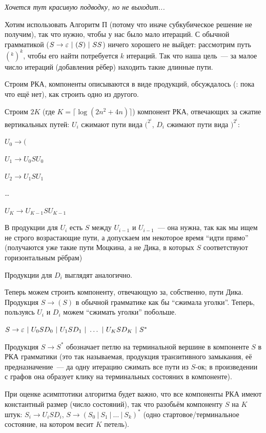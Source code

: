 \textit{Хочется тут красивую подводку, но не выходит...}

Хотим использовать Алгоритм П (потому что иначе субкубическое решение не получим), так что нужно, чтобы у нас было мало итераций. С обычной грамматикой ($S \rightarrow \varepsilon~|~(S)~|~SS$) ничего хорошего не выйдет: рассмотрим путь $(^k )^k$, чтобы его найти потребуется $k$ итераций. Так что наша цель~--- за малое число итераций (добавления рёбер) находить такие длинные пути.

Строим РКА, компоненты описываются в виде продукций, обсуждалось (\TODO: пока что ещё нет), как строить одно из другого.

Строим $2K$ (где $K = \lceil \log (2 n^2 + 4n) \rceil$) компонент РКА, отвечающих за сжатие вертикальных путей: $U_i$ сжимают пути вида $(^{2^i}$, $D_i$ сжимают пути вида $)^{2^i}$:

$U_0 \to ($

$U_1 \to U_0 S U_0$

$U_2 \to U_1 S U_1$

\dots

$U_K \to U_{K-1} S U_{K-1}$ 

В продукции для $U_i$ есть $S$ между $U_{i-1}$ и $U_{i-1}$~--- она нужна, так как мы ищем не строго возрастающие пути, а допускаем им некоторое время ``идти прямо'' (получаются уже такие пути Моцкина, а не Дика, в которых $S$ соответствуют горизонтальным рёбрам)

Продукции для $D_i$ выглядят аналогично.

Теперь можем строить компоненту, отвечающую за, собственно, пути Дика. Продукция $S \to ( S )$ в обычной грамматике как бы ``сжимала уголки''. Теперь, пользуясь $U_i$ и $D_i$ можем ``сжимать уголки'' побольше.

$S \rightarrow \varepsilon~|~U_0 S D_0~|~U_1 S D_1~|~ \dots ~|~U_K S D_K~|~S^*$

Продукция $S \to S^*$ обозначает петлю на терминальной вершине в компоненте $S$ в РКА грамматики (это так называемая, продукция транзитивного замыкания, её предназначение~--- да одну итерацию сжимать все пути из $S$-ок; в произведении с графов она образует клику на терминальных состояних в компоненте).

При оценке асимптотики алгоритма будет важно, что все компоненты РКА имеют константный размер (число состояний), так что разобьём компоненту $S$ на $K$ штук: $S_i \to U_i S D_i$, $S \to (S_0~|~S_1~|~ \dots ~|~ S_k)^*$ (одно стартовое/терминальное состояние, на котором весит $K$ петель).

